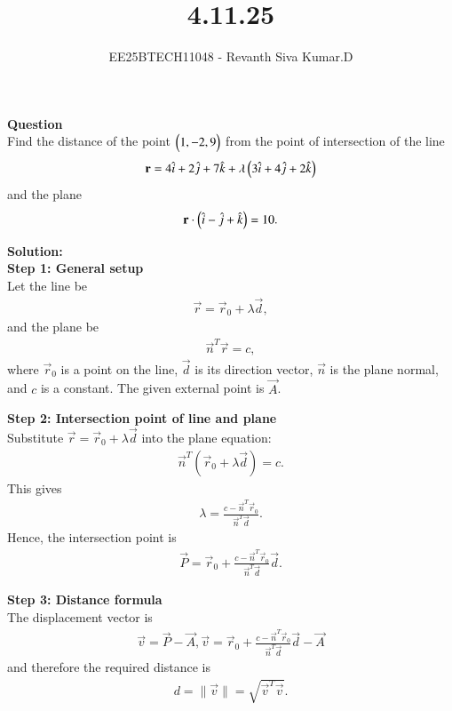 \documentclass[journal]{IEEEtran}
\begin{document}

\vspace{3cm}

\title{4.11.25}
\author{EE25BTECH11048 - Revanth Siva Kumar.D}
{\let\newpage\relax\maketitle}

\textbf{Question} \\
Find the distance of the point $\begin{pmatrix}1,-2,9\end{pmatrix}$ from the point of intersection of the line
\[
\mathbf{r} = 4\hat{i} + 2\hat{j} + 7\hat{k} + \lambda \begin{pmatrix}3\hat{i} + 4\hat{j} + 2\hat{k}\end{pmatrix}
\]
and the plane
\[
\mathbf{r}\cdot\begin{pmatrix}\hat{i} - \hat{j} + \hat{k}\end{pmatrix} = 10.
\]

\textbf{Solution:} \\

\textbf{Step 1: General setup} \\
Let the line be
\begin{align}
    \vec{r} = \vec{r}_0 + \lambda \vec{d},
\end{align}
and the plane be
\begin{align}
    \vec{n}^T \vec{r} = c,
\end{align}
where $\vec{r}_0$ is a point on the line, $\vec{d}$ is its direction vector, $\vec{n}$ is the plane normal, and $c$ is a constant.  
The given external point is $\vec{A}$.

\textbf{Step 2: Intersection point of line and plane} \\
Substitute $\vec{r}=\vec{r}_0+\lambda\vec{d}$ into the plane equation:
\begin{align}
    \vec{n}^T(\vec{r}_0+\lambda \vec{d}) = c.
\end{align}
This gives
\begin{align}
    \lambda = \frac{c - \vec{n}^T\vec{r}_0}{\vec{n}^T \vec{d}}.
\end{align}
Hence, the intersection point is
\begin{align}
    \vec{P} = \vec{r}_0 + \frac{c - \vec{n}^T\vec{r}_0}{\vec{n}^T\vec{d}} \vec{d}.
\end{align}

\textbf{Step 3: Distance formula} \\
The displacement vector is
\begin{align}
    \vec{v} = \vec{P} - \vec{A},
    \vec{v}=\vec{r}_0 + \frac{c - \vec{n}^T\vec{r}_0}{\vec{n}^T\vec{d}} \vec{d} - \vec{A}
\end{align}
and therefore the required distance is
\begin{align}
    d = \|\vec{v}\| = \sqrt{\vec{v}^T\vec{v}}.
\end{align}
\end{document}
